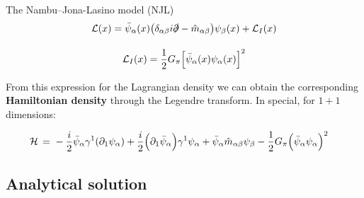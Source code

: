 \begin{frame}[allowframebreaks]{The Nambu--Jona-Lasino model (NJL)}
	\begin{gather*}
		\mathcal{L}(x) =
	    \bar{\psi}_{\alpha}(x)
	    \qty(\delta_{\alpha\beta}i\slashed{\partial}-\hat{m}_{\alpha\beta})
	    \psi_{\beta}(x) + \mathcal{L}_{I}(x) \\[1em]
		\mathcal{L}_{I}(x) =
	    \frac{1}{2} G_{\pi} \qty[\bar{\psi}_{\alpha}(x)\psi_{\alpha}(x)]^2
	\end{gather*}

	From this expression for the Lagrangian density we can obtain the corresponding \textbf{Hamiltonian density} through the Legendre transform. In special, for $1+1$ dimensions:

	\begin{align*}
		\mathcal{H} \,=\,\,
	  & -\frac{i}{2} \bar{\psi}_{\alpha} \gamma^{1}
	    \qty(\partial_{1} \psi_{\alpha}) +
	    \frac{i}{2} \qty(\partial_{1}\bar{\psi}_{\alpha})\gamma^{1}\psi_{\alpha} +
	    \bar{\psi}_{\alpha} \hat{m}_{\alpha\beta} \psi_{\beta} -
	    \frac{1}{2} G_{\pi} \qty(\bar{\psi}_{\alpha}\psi_{\alpha})^{2}
	\end{align*}

\end{frame}



\subsection{Analytical solution}


